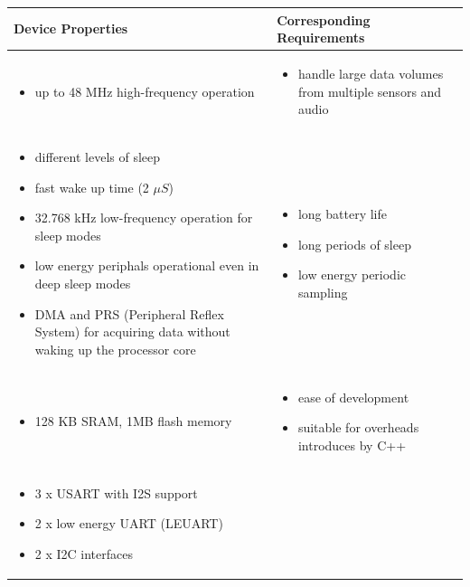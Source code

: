 \begin{table}[htb]
\begin{tabular}{|m{}|m{}|}
\hline 
	\textbf{Device Properties} & 
	\textbf{Corresponding Requirements} \\ 
\hline
	\phantom{.}
	\begin{itemize}
	\item up to 48 MHz high-frequency operation
	\end{itemize}&
	\phantom{.}
	\begin{itemize}
	\item handle large data volumes from multiple sensors and audio
	\end{itemize} \\	
\hline
	\phantom{.}
	\begin{itemize}
	\item different levels of sleep
	\item fast wake up time (2 $\mu S$)
	\item 32.768 kHz low-frequency operation for sleep modes
	\item low energy periphals operational even in deep sleep modes
	\item DMA and PRS (Peripheral Reflex System) for acquiring data without waking up the processor core
	\end{itemize} &
	\begin{itemize}
	\item long battery life
	\item long periods of sleep
	\item low energy periodic sampling
	\end{itemize} \\
\hline
	\phantom{.}
	\begin{itemize}
	\item 128 KB SRAM, 1MB flash memory
	\end{itemize} &
	\phantom{.}
	\begin{itemize}
	\item ease of development
	\item suitable for overheads introduces by C++
	\end{itemize} \\
\hline
	\phantom{.}
	\begin{itemize}
	\item 3 x USART with I2S support
	\item 2 x low energy UART (LEUART)
	\item 2 x I2C interfaces
	\end{itemize} &

\end{tabular}
\end{table}
